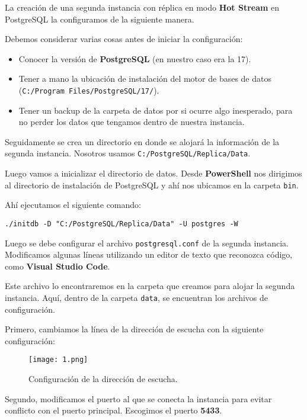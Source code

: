 \documentclass{article}
\begin{document}
La creación de una segunda instancia con réplica en modo \textbf{Hot Stream} en PostgreSQL la configuramos de la siguiente manera.

Debemos considerar varias cosas antes de iniciar la configuración:
\begin{itemize}
    \item Conocer la versión de \textbf{PostgreSQL} (en nuestro caso era la 17).
    \item Tener a mano la ubicación de instalación del motor de bases de datos (\texttt{C:/Program Files/PostgreSQL/17/}).
    \item Tener un backup de la carpeta de datos por si ocurre algo inesperado, para no perder los datos que tengamos dentro de nuestra instancia.
\end{itemize}

Seguidamente se crea un directorio en donde se alojará la información de la segunda instancia. Nosotros usamos \texttt{C:/PostgreSQL/Replica/Data}.

Luego vamos a inicializar el directorio de datos. Desde \textbf{PowerShell} nos dirigimos al directorio de instalación de PostgreSQL y ahí nos ubicamos en la carpeta \texttt{bin}.

Ahí ejecutamos el siguiente comando:

\begin{verbatim}
./initdb -D "C:/PostgreSQL/Replica/Data" -U postgres -W
\end{verbatim}

Luego se debe configurar el archivo \texttt{postgresql.conf} de la segunda instancia. Modificamos algunas líneas utilizando un editor de texto que reconozca código, como \textbf{Visual Studio Code}.

Este archivo lo encontraremos en la carpeta que creamos para alojar la segunda instancia. Aquí, dentro de la carpeta \texttt{data}, se encuentran los archivos de configuración.

\newpage
Primero, cambiamos la línea de la dirección de escucha con la siguiente configuración:

\begin{figure}[h]
    \centering
    \texttt{[image: 1.png]}
    \caption{Configuración de la dirección de escucha.}
\end{figure}

Segundo, modificamos el puerto al que se conecta la instancia para evitar conflicto con el puerto principal. Escogimos el puerto \textbf{5433}.
\end{document}
